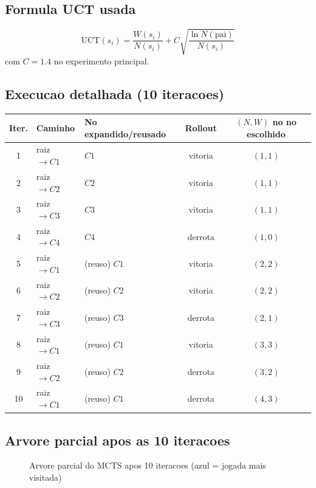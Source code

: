 \subsection{Formula UCT usada}
\[
\mathrm{UCT}(s_i)=\frac{W(s_i)}{N(s_i)} + C\sqrt{\frac{\ln N(\text{pai})}{N(s_i)}}
\]
com $C=1.4$ no experimento principal.

\subsection{Execucao detalhada (10 iteracoes)}
\begingroup
\footnotesize
\setlength{\tabcolsep}{4pt}
\begin{longtable}{c p{2.5cm} p{3.0cm} c c}
\toprule
Iter. & Caminho & No expandido/reusado & Rollout & $(N,W)$ no no escolhido \\
\midrule
1 & raiz $\rightarrow C1$ & $C1$ & vitoria & $(1,1)$ \\
2 & raiz $\rightarrow C2$ & $C2$ & vitoria & $(1,1)$ \\
3 & raiz $\rightarrow C3$ & $C3$ & vitoria & $(1,1)$ \\
4 & raiz $\rightarrow C4$ & $C4$ & derrota & $(1,0)$ \\
5 & raiz $\rightarrow C1$ & (reuso) $C1$ & vitoria & $(2,2)$ \\
6 & raiz $\rightarrow C2$ & (reuso) $C2$ & vitoria & $(2,2)$ \\
7 & raiz $\rightarrow C3$ & (reuso) $C3$ & derrota & $(2,1)$ \\
8 & raiz $\rightarrow C1$ & (reuso) $C1$ & vitoria & $(3,3)$ \\
9 & raiz $\rightarrow C2$ & (reuso) $C2$ & derrota & $(3,2)$ \\
10 & raiz $\rightarrow C1$ & (reuso) $C1$ & derrota & $(4,3)$ \\
\bottomrule
\end{longtable}
\endgroup

\subsection{Arvore parcial apos as 10 iteracoes}
\begin{figure}[H]
\centering
{}
\caption{Arvore parcial do MCTS apos 10 iteracoes (azul = jogada mais visitada)}
\end{figure}


